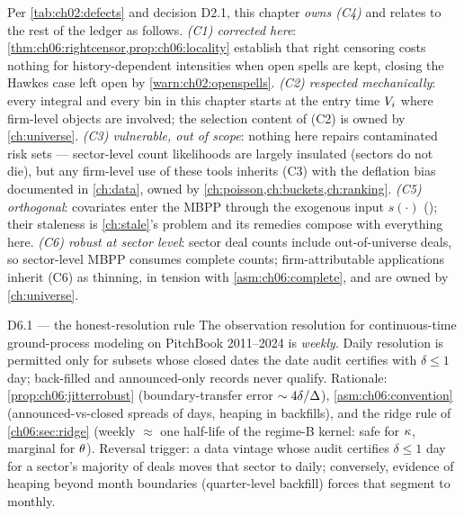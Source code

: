 Per \cref{tab:ch02:defects} and decision D2.1, this chapter \emph{owns
(C4)} and relates to the rest of the ledger as follows.
\emph{(C1) corrected here}: \cref{thm:ch06:rightcensor,prop:ch06:locality}
establish that right censoring costs nothing for history-dependent
intensities when open spells are kept, closing the Hawkes case left open by
\cref{warn:ch02:openspells}. \emph{(C2) respected mechanically}: every
integral and every bin in this chapter starts at the entry time
$V_i$ where firm-level objects are involved; the selection content of
(C2) is owned by \cref{ch:universe}. \emph{(C3) vulnerable, out of
scope}: nothing here repairs contaminated risk sets --- sector-level count
likelihoods are largely insulated (sectors do not die), but any firm-level
use of these tools inherits (C3) with the deflation bias documented in
\cref{ch:data}, owned by \cref{ch:poisson,ch:buckets,ch:ranking}.
\emph{(C5) orthogonal}: covariates enter the MBPP through the exogenous
input $s(\cdot)$ (); their staleness is
\cref{ch:stale}'s problem and its remedies compose with everything here.
\emph{(C6) robust at sector level}: sector deal counts include
out-of-universe deals, so sector-level MBPP consumes complete counts;
firm-attributable applications inherit (C6) as thinning, in tension with
\cref{asm:ch06:complete}, and are owned by \cref{ch:universe}.

\begin{decision}{D6.1 --- the honest-resolution rule}
The observation resolution for continuous-time ground-process modeling on
PitchBook 2011--2024 is \emph{weekly}. Daily resolution is permitted only
for subsets whose closed dates the date audit certifies with
$\delta \le 1$ day; back-filled and announced-only records never qualify.
Rationale: \cref{prop:ch06:jitterrobust} (boundary-transfer error
$\sim 4\delta/\Delta$), \cref{asm:ch06:convention} (announced-vs-closed
spreads of days, heaping in backfills), and the ridge rule of
\cref{ch06:sec:ridge} (weekly $\approx$ one half-life of the regime-B
kernel: safe for $\kappa$, marginal for $\theta$). Reversal trigger: a
data vintage whose audit certifies $\delta \le 1$ day for a sector's
majority of deals moves that sector to daily; conversely, evidence of
heaping beyond month boundaries (quarter-level backfill) forces that
segment to monthly.
\end{decision}

